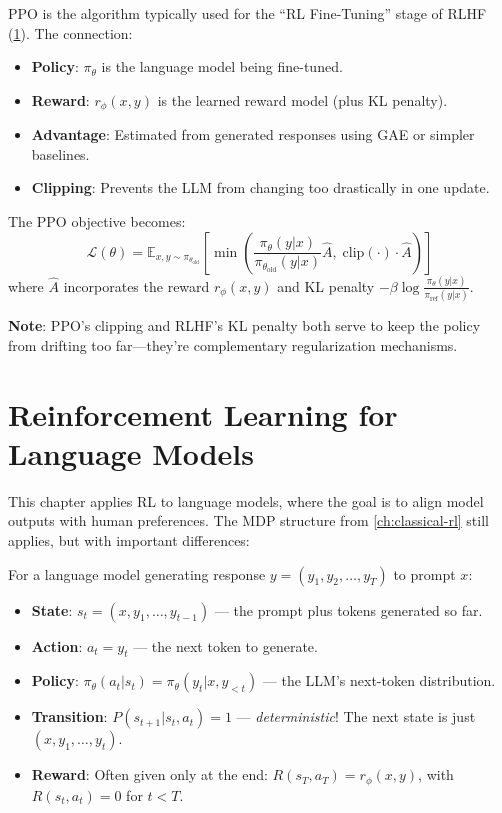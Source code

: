 \begin{remark}
    PPO is the algorithm typically used for the ``RL Fine-Tuning'' stage of RLHF (\cref{ch:rl-for-llms}). The connection:
    \begin{itemize}
        \item \textbf{Policy}: $\pi_\theta$ is the language model being fine-tuned.
        \item \textbf{Reward}: $r_\phi(x,y)$ is the learned reward model (plus KL penalty).
        \item \textbf{Advantage}: Estimated from generated responses using GAE or simpler baselines.
        \item \textbf{Clipping}: Prevents the LLM from changing too drastically in one update.
    \end{itemize}
    The PPO objective becomes:
    \[
        \mathcal{L}(\theta) = \mathbb{E}_{x, y \sim \pi_{\theta_{\text{old}}}} \left[ \min\left( \frac{\pi_\theta(y|x)}{\pi_{\theta_{\text{old}}}(y|x)} \hat{A}, \; \text{clip}(\cdot) \cdot \hat{A} \right) \right]
    \]
    where $\hat{A}$ incorporates the reward $r_\phi(x,y)$ and KL penalty $-\beta \log \frac{\pi_\theta(y|x)}{\pi_{\text{ref}}(y|x)}$.

    \textbf{Note}: PPO's clipping and RLHF's KL penalty both serve to keep the policy from drifting too far---they're complementary regularization mechanisms.
\end{remark}

\chapter{Reinforcement Learning for Language Models}
\label{ch:rl-for-llms}

This chapter applies RL to language models, where the goal is to align model outputs with human preferences. The MDP structure from \cref{ch:classical-rl} still applies, but with important differences:

\begin{remark}
    For a language model generating response $y = (y_1, y_2, \ldots, y_T)$ to prompt $x$:
    \begin{itemize}
        \item \textbf{State}: $s_t = (x, y_1, \ldots, y_{t-1})$ --- the prompt plus tokens generated so far.
        \item \textbf{Action}: $a_t = y_t$ --- the next token to generate.
        \item \textbf{Policy}: $\pi_\theta(a_t | s_t) = \pi_\theta(y_t | x, y_{<t})$ --- the LLM's next-token distribution.
        \item \textbf{Transition}: $P(s_{t+1}|s_t, a_t) = 1$ --- \emph{deterministic}! The next state is just $(x, y_1, \ldots, y_t)$.
        \item \textbf{Reward}: Often given only at the end: $R(s_T, a_T) = r_\phi(x, y)$, with $R(s_t, a_t) = 0$ for $t < T$.
    \end{itemize}
\end{remark}


